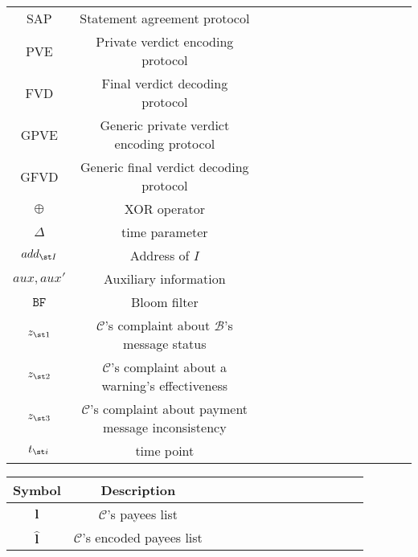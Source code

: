 \begin{table*}[!htbp]
\begin{scriptsize}
\begin{center}
{{\begin{tabular}{|c|c|c|c|c|c|c|c|c|c|c|c|c|c|}
%
 {   }\scriptsize{SAP} & {   }\scriptsize  Statement agreement protocol\\ 
%
 {    }\scriptsize{PVE} & {    }\scriptsize  Private verdict encoding protocol\\ 
%
 {   }\scriptsize{FVD} & {   }\scriptsize  Final verdict decoding protocol\\ 
%
 {    }\scriptsize{GPVE} & {    }\scriptsize  Generic private verdict encoding protocol\\ 
%
 {   }\scriptsize{GFVD} & {   }\scriptsize  Generic final verdict decoding protocol\\ 
%
 {    }\scriptsize$\oplus$ & {    }\scriptsize  XOR operator \\ 
%
 {   }\scriptsize$\Delta$ & {   }\scriptsize  time parameter \\ 
%
 {    }\scriptsize$add_{\st I}$ & {    }\scriptsize  Address of $I$\\ 
%
 {   }\scriptsize$aux, aux'$ & {   }\scriptsize  Auxiliary information\\ 
%
 {    }\scriptsize$\mathtt{BF}$ & {    }\scriptsize  Bloom filter\\ 
%
 {   }\scriptsize$z_{\st 1}$ & {   }\scriptsize  $\mathcal{C}$'s complaint about $\mathcal{B}$'s message status\\ 
%
 {    }\scriptsize$z_{\st 2}$ & {    }\scriptsize  $\mathcal{C}$'s complaint about a warning's effectiveness\\
% 
 {   }\scriptsize$z_{\st 3}$ & {   }\scriptsize  $\mathcal{C}$'s complaint about payment message  inconsistency\\ 
%
 {   }\scriptsize$t_{\st i}$ &\scriptsize  time point\\ 



                     
 \hline
  


\end{tabular}

\begin{tabular}{|c|c|c|c|c|c|c|c|c|c|c|c|c|c|} 
    \hline
 {  } \scriptsize \textbf{Symbol}& {  } \scriptsize \textbf{Description}  \\
    \hline
    
\hline


%

 {   }\scriptsize$\bm{l}$ & {   }\scriptsize  $\mathcal{C}$'s payees list\\ 
%
 {    }\scriptsize$\hat{\bm{l}}$ & {    }\scriptsize  $\mathcal{C}$'s encoded payees list\\ 
%



\end{tabular}}}
\end{center}
\end{scriptsize}
\end{table*}
